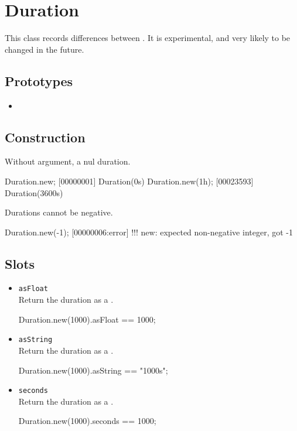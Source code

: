 \section{Duration}

This class records differences between .  It is
experimental, and very likely to be changed in the future.

\subsection{Prototypes}
\begin{itemize}
\item {}
\end{itemize}

\subsection{Construction}

Without argument, a nul duration.

\begin{urbiscript}
Duration.new;
[00000001] Duration(0s)
Duration.new(1h);
[00023593] Duration(3600s)
\end{urbiscript}

Durations cannot be negative.

\begin{urbiassert}[firstnumber=last]
Duration.new(-1);
[00000006:error] !!! new: expected non-negative integer, got -1
\end{urbiassert}


\subsection{Slots}

\begin{itemize}
\item \lstinline|asFloat|\\
  Return the duration as a .
\begin{urbiassert}[firstnumber=last]
Duration.new(1000).asFloat == 1000;
\end{urbiassert}

\item \lstinline|asString|\\
  Return the duration as a .
\begin{urbiassert}[firstnumber=last]
Duration.new(1000).asString == "1000s";
\end{urbiassert}

\item \lstinline|seconds|\\
  Return the duration as a .
\begin{urbiassert}[firstnumber=last]
Duration.new(1000).seconds == 1000;
\end{urbiassert}
\end{itemize}


